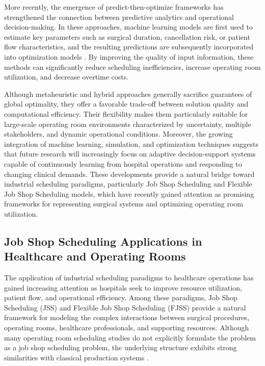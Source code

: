 \documentclass[sn-mathphys-num]{sn-jnl}
\begin{document}
    More recently, the emergence of predict-then-optimize frameworks has strengthened the connection between predictive analytics and operational decision-making. In these approaches, machine learning models are first used to estimate key parameters such as surgical duration, cancellation risk, or patient flow characteristics, and the resulting predictions are subsequently incorporated into optimization models \cite{fairley2019,abbou2022,lex2025}. By improving the quality of input information, these methods can significantly reduce scheduling inefficiencies, increase operating room utilization, and decrease overtime costs.
    
    Although metaheuristic and hybrid approaches generally sacrifice guarantees of global optimality, they offer a favorable trade-off between solution quality and computational efficiency. Their flexibility makes them particularly suitable for large-scale operating room environments characterized by uncertainty, multiple stakeholders, and dynamic operational conditions. Moreover, the growing integration of machine learning, simulation, and optimization techniques suggests that future research will increasingly focus on adaptive decision-support systems capable of continuously learning from hospital operations and responding to changing clinical demands. These developments provide a natural bridge toward industrial scheduling paradigms, particularly Job Shop Scheduling and Flexible Job Shop Scheduling models, which have recently gained attention as promising frameworks for representing surgical systems and optimizing operating room utilization.
    
    \subsection*{Job Shop Scheduling Applications in Healthcare and Operating Rooms}

    The application of industrial scheduling paradigms to healthcare operations has gained increasing attention as hospitals seek to improve resource utilization, patient flow, and operational efficiency. Among these paradigms, Job Shop Scheduling (JSS) and Flexible Job Shop Scheduling (FJSS) provide a natural framework for modeling the complex interactions between surgical procedures, operating rooms, healthcare professionals, and supporting resources. Although many operating room scheduling studies do not explicitly formulate the problem as a job shop scheduling problem, the underlying structure exhibits strong similarities with classical production systems \cite{cardoen2010_review,barbagallo2015}.
    
\end{document}
